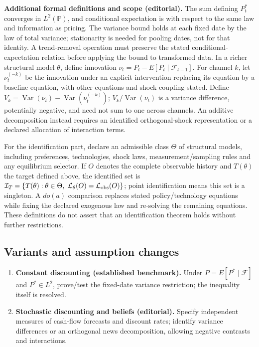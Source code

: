 \documentclass[11pt,a4paper]{article}
\begin{document}
\textbf{Additional formal definitions and scope (editorial).} The sum defining \(P_t^*\) converges in \(L^2(\mathbb P)\), and conditional expectation is with respect to the same law and information as pricing. The variance bound holds at each fixed date by the law of total variance; stationarity is needed for pooling dates, not for that identity. A trend-removal operation must preserve the stated conditional-expectation relation before applying the bound to transformed data. In a richer structural model \(\theta\), define innovation \(\nu_t=P_t-E[P_t\mid\mathcal F_{t-1}]\). For channel \(k\), let \(\nu_t^{(-k)}\) be the innovation under an explicit intervention replacing its equation by a baseline equation, with other equations and shock coupling stated. Define \(V_k=\operatorname{Var}(\nu_t)-\operatorname{Var}(\nu_t^{(-k)})\); \(V_k/\operatorname{Var}(\nu_t)\) is a variance difference, potentially negative, and need not sum to one across channels. An additive decomposition instead requires an identified orthogonal-shock representation or a declared allocation of interaction terms.

For the identification part, declare an admissible class \(\Theta\) of structural models, including preferences, technologies, shock laws, measurement/sampling rules and any equilibrium selector. If \(O\) denotes the complete observable history and \(T(\theta)\) the target defined above, the identified set is \(\mathcal I_T=\{T(\theta):\theta\in\Theta,\ \mathcal L_\theta(O)=\mathcal L_{\rm obs}(O)\}\); point identification means this set is a singleton. A \(do(a)\) comparison replaces stated policy/technology equations while fixing the declared exogenous law and re-solving the remaining equations. These definitions do not assert that an identification theorem holds without further restrictions.
\subsection*{Variants and assumption changes}
\begin{enumerate}
\item \textbf{Constant discounting (established benchmark).} Under \(P=E[P^*\mid\mathcal F]\) and \(P^*\in L^2\), prove/test the fixed-date variance restriction; the inequality itself is resolved.
\item \textbf{Stochastic discounting and beliefs (editorial).} Specify independent measures of cash-flow forecasts and discount rates; identify variance differences or an orthogonal news decomposition, allowing negative contrasts and interactions.
\end{enumerate}
\end{document}
